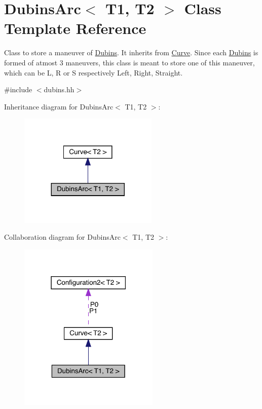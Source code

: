 \hypertarget{class_dubins_arc}{}\section{Dubins\+Arc$<$ T1, T2 $>$ Class Template Reference}
\label{class_dubins_arc}


Class to store a maneuver of \mbox{\hyperlink{class_dubins}{Dubins}}. It inherits from {\ttfamily \mbox{\hyperlink{class_curve}{Curve}}}. Since each \mbox{\hyperlink{class_dubins}{Dubins}} is formed of atmost 3 maneuvers, this class is meant to store one of this maneuver, which can be L, R or S respectively Left, Right, Straight.  




{\ttfamily \#include $<$dubins.\+hh$>$}



Inheritance diagram for Dubins\+Arc$<$ T1, T2 $>$\+:
\nopagebreak
\begin{figure}[H]
\begin{center}
\leavevmode
\includegraphics[width=188pt]{class_dubins_arc__inherit__graph}
\end{center}
\end{figure}


Collaboration diagram for Dubins\+Arc$<$ T1, T2 $>$\+:
\nopagebreak
\begin{figure}[H]
\begin{center}
\leavevmode
\includegraphics[width=190pt]{class_dubins_arc__coll__graph}
\end{center}
\end{figure}
